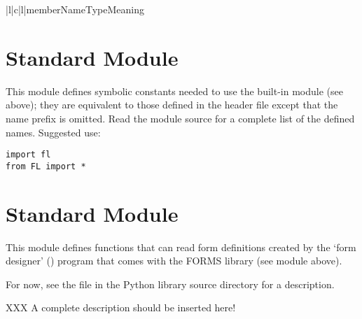\begin{tableiii}{|l|c|l|}{member}{Name}{Type}{Meaning}
\end{tableiii}

\section{Standard Module }
\label{module-FLuppercase}

This module defines symbolic constants needed to use the built-in
module  (see above); they are equivalent to those defined in
the \C{} header file  except that the name prefix
 is omitted.  Read the module source for a complete list of
the defined names.  Suggested use:

\begin{verbatim}
import fl
from FL import *
\end{verbatim}

\section{Standard Module }
\label{module-flp}

This module defines functions that can read form definitions created
by the `form designer' () program that comes with the
FORMS library (see module  above).

For now, see the file  in the Python library source
directory for a description.

XXX A complete description should be inserted here!
